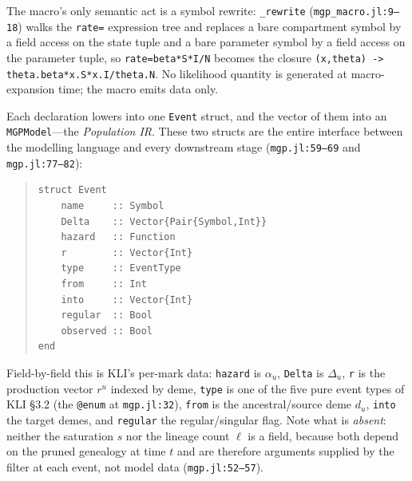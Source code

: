 \documentclass[11pt,leqno]{article}
\newcommand{\code}[1]{\texttt{#1}}
\theoremstyle{plain}
\theoremstyle{definition}
\begin{document}
The macro's only semantic act is a symbol rewrite: \code{\_rewrite}
(\code{mgp\_macro.jl:9--18}) walks the \code{rate=} expression tree and
replaces a bare compartment symbol by a field access on the state tuple and a
bare parameter symbol by a field access on the parameter tuple, so
\code{rate=beta*S*I/N} becomes the closure \code{(x,theta) ->
theta.beta*x.S*x.I/theta.N}.  No likelihood quantity is generated at
macro-expansion time; the macro emits data only.

Each declaration lowers into one \code{Event} struct, and the vector of them
into an \code{MGPModel}---the \emph{Population IR}.  These two structs are the
entire interface between the modelling language and every downstream stage
(\code{mgp.jl:59--69} and \code{mgp.jl:77--82}):
\begin{quote}
{\small
\begin{verbatim}
struct Event
    name     :: Symbol
    Delta    :: Vector{Pair{Symbol,Int}}
    hazard   :: Function
    r        :: Vector{Int}
    type     :: EventType
    from     :: Int
    into     :: Vector{Int}
    regular  :: Bool
    observed :: Bool
end
\end{verbatim}
}
\end{quote}
Field-by-field this is KLI's per-mark data: \code{hazard} is $\alpha_u$,
\code{Delta} is $\Delta_u$, \code{r} is the production vector $r^u$ indexed by
deme, \code{type} is one of the five pure event types of KLI \S3.2 (the
\code{@enum} at \code{mgp.jl:32}), \code{from} is the ancestral/source deme
$d_u$, \code{into} the target demes, and \code{regular} the
regular/singular flag.  Note what is \emph{absent}: neither the saturation
$s$ nor the lineage count $\ell$ is a field, because both depend on the
pruned genealogy at time $t$ and are therefore arguments supplied by the
filter at each event, not model data (\code{mgp.jl:52--57}).
\end{document}
